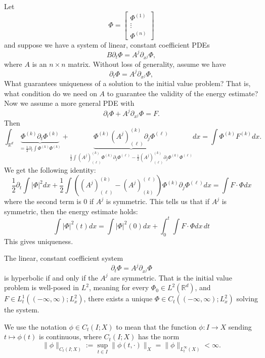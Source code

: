 \begin{example}
 Let 
$$
\Phi=\left[\begin{array}{c}
\Phi^{(1)} \\
\vdots \\
\Phi^{(n)}
\end{array}\right]
$$
and suppose we have a system of linear, constant coefficient PDEs
$$
B \partial_{t} \Phi=A^{j} \partial_{x^{j}} \Phi,
$$
where $A$ is an $n \times n$ matrix. Without loss of generality, assume we have
$$
\partial_{t} \Phi=A^{j} \partial_{x^{j}} \Phi,
$$
What guarantees uniqueness of a solution to the initial value problem? That is, what condition do we need on $A$ to guarantee the validity of the energy estimate? Now we assume a more general PDE with 
\[
    \partial_{t} \Phi + A^{j} \partial_{x^{j}} \Phi = F.
\]
Then 
$$
\int_{\mathbb{R}^{d}} \underbrace{\Phi^{(k)} \partial_{t} \Phi^{(k)}}_{=\frac{1}{2} \partial_{t} \int \Phi^{(k)} \Phi^{(k)}}+\underbrace{\Phi^{(k)}\left(A^{j}\right)_{(\ell)}^{(k)} \partial_{j} \Phi^{(\ell)}}_{\frac{1}{2} \int\left(A^{j}\right)_{(\ell)}^{(k)} \Phi^{(k)} \partial_{j} \Phi^{(\ell)}-\frac{1}{2}\left(A^{j}\right)_{(\ell)}^{(k)} \partial_{j} \Phi^{(k)} \Phi^{(\ell)}} d x=\int \Phi^{(k)} F^{(k)} d x .
$$
We get the following identity:
$$
\frac{1}{2} \partial_{t} \int|\Phi|^{2} d x+\frac{1}{2} \int\left(\left(A^{j}\right)_{(\ell)}^{(k)}-\left(A^{j}\right)_{(k)}^{(\ell)}\right) \Phi^{(k)} \partial_{j} \Phi^{(\ell)} d x=\int F \cdot \Phi d x
$$
where the second term is 0 if $A^{j}$ is symmetric.
This tells us that if $A^{j}$ is symmetric, then the energy estimate holds:
$$
\int|\Phi|^{2}(t) d x=\int|\Phi|^{2}(0) d x+\int_{0}^{t} \int F \cdot \Phi d x\, d t
$$
This gives uniqueness.

\begin{theorem}
    The linear, constant coefficient system
    $$
    \partial_{t} \Phi=A^{j} \partial_{x^{j}} \Phi
    $$
    is hyperbolic if and only if the $A^{j}$ are symmetric. That is the initial value problem is well-posed in $L^{2}$, meaning for every $\Phi_{0} \in L^{2}\left(\mathbb{R}^{d}\right)$, and $F \in L_{t}^{1}\left((-\infty, \infty) ; L_{x}^{2}\right)$, there exists a unique $\Phi \in C_{t}\left((-\infty, \infty) ; L_{x}^{2}\right)$ solving the system.

\end{theorem}
\end{example}

We use the notation $\phi \in C_{t}(I ; X)$ to mean that the function $\phi: I \rightarrow X$ sending $t \mapsto \phi(t)$ is continuous, where $C_{t}(I ; X)$ has the norm
$$
\|\phi\|_{C_{t}(I ; X)}:=\sup _{t \in I}\|\phi(t, \cdot)\|_{X}=\|\phi\|_{L_{t}^{\infty}(X)}<\infty .
$$

